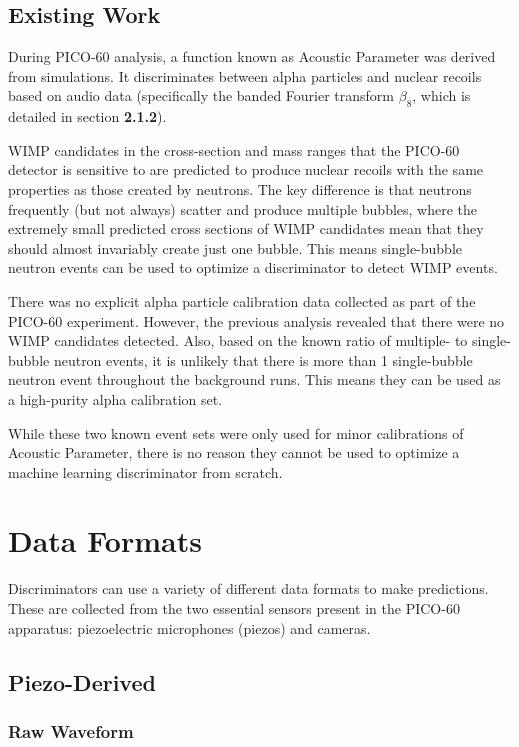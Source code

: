 \documentclass[10pt]{article}
\begin{document}
\subsection{Existing Work}

During PICO-60 analysis, a function known as Acoustic Parameter was derived from simulations. It discriminates between alpha particles and nuclear recoils based on audio data (specifically the banded Fourier transform $\beta_{8}$, which is detailed in section \textbf{2.1.2}).

WIMP candidates in the cross-section and mass ranges that the PICO-60 detector is sensitive to are predicted to produce nuclear recoils with the same properties as those created by neutrons. The key difference is that neutrons frequently (but not always) scatter and produce multiple bubbles, where the extremely small predicted cross sections of WIMP candidates mean that they should almost invariably create just one bubble. This means single-bubble neutron events can be used to optimize a discriminator to detect WIMP events.

There was no explicit alpha particle calibration data collected as part of the PICO-60 experiment. However, the previous analysis revealed that there were no WIMP candidates detected. Also, based on the known ratio of multiple- to single-bubble neutron events, it is unlikely that there is more than 1 single-bubble neutron event throughout the background runs. This means they can be used as a high-purity alpha calibration set.

While these two known event sets were only used for minor calibrations of Acoustic Parameter, there is no reason they cannot be used to optimize a machine learning discriminator from scratch.

\section{Data Formats}

Discriminators can use a variety of different data formats to make predictions. These are collected from the two essential sensors present in the PICO-60 apparatus: piezoelectric microphones (piezos) and cameras.

\subsection{Piezo-Derived}

\subsubsection{Raw Waveform}
\end{document}
